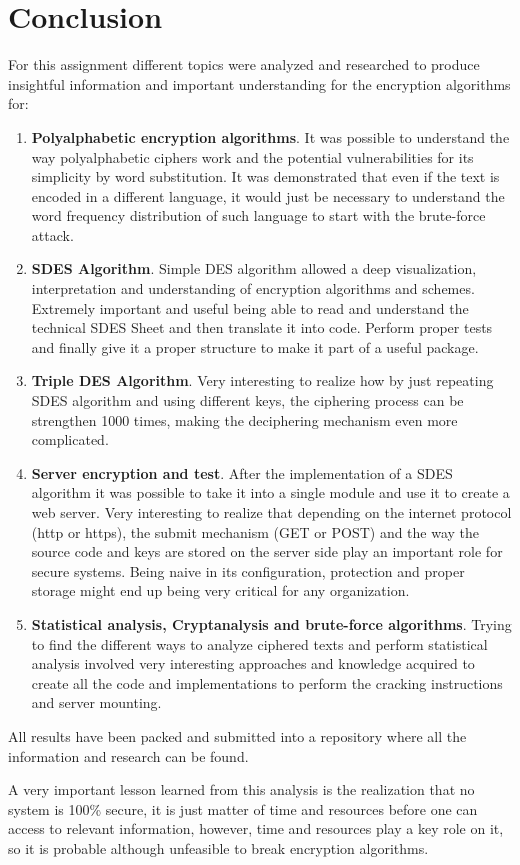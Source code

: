 \documentclass[letterpaper,12pt]{article}
\begin{document}
\section{Conclusion}
For this assignment different topics were analyzed and researched to produce insightful information and important understanding for the encryption algorithms for:
\begin{enumerate}
    \item \textbf{Polyalphabetic encryption algorithms}. It was possible to understand the way polyalphabetic ciphers work and the potential vulnerabilities for its simplicity by word substitution. It was demonstrated that even if the text is encoded in a different language, it would just be necessary to understand the word frequency distribution of such language to start with the brute-force attack.
    \item \textbf{SDES Algorithm}. Simple DES algorithm allowed a deep visualization, interpretation and understanding of encryption algorithms and schemes. Extremely important and useful being able to read and understand the technical SDES Sheet\cite{WS2017-SDES} and then translate it into code. Perform proper tests and finally give it a proper structure to make it part of a useful package. 
    \item \textbf{Triple DES Algorithm}. Very interesting to realize how by just repeating SDES algorithm and using different keys, the ciphering process can be strengthen 1000 times, making the deciphering mechanism even more complicated.
    \item \textbf{Server encryption and test}. After the implementation of a SDES algorithm it was possible to take it into a single module and use it to create a web server. Very interesting to realize that depending on the internet protocol (http or https), the submit mechanism (GET or POST) and the way the source code and keys are stored on the server side play an important role for secure systems. Being naive in its configuration, protection and proper storage might end up being very critical for any organization.
    \item \textbf{Statistical analysis, Cryptanalysis and brute-force algorithms}. Trying to find the different ways to analyze ciphered texts and perform statistical analysis involved very interesting approaches and knowledge acquired to create all the code and implementations to perform the cracking instructions and server mounting.
\end{enumerate}
All results have been packed and submitted into a repository where all the information and research can be found.

A very important lesson learned from this analysis is the realization that no system is 100\% secure, it is just matter of time and resources before one can access to relevant information, however, time and resources play a key role on it, so it is probable although unfeasible to break encryption algorithms.




\end{document}
